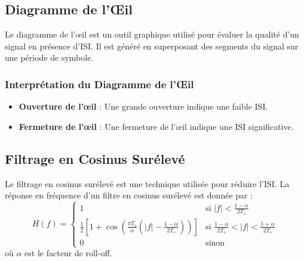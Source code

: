 \documentclass[10pt,a4paper]{article}
\begin{document}
\subsection*{Diagramme de l'Œil}
Le diagramme de l'œil est un outil graphique utilisé pour évaluer la qualité d'un signal en présence d'ISI. Il est généré en superposant des segments du signal sur une période de symbole.

\subsubsection*{Interprétation du Diagramme de l'Œil}
\begin{itemize}
    \item \textbf{Ouverture de l'œil} : Une grande ouverture indique une faible ISI.
    \item \textbf{Fermeture de l'œil} : Une fermeture de l'œil indique une ISI significative.
\end{itemize}


\subsection*{Filtrage en Cosinus Surélevé}
Le filtrage en cosinus surélevé est une technique utilisée pour réduire l'ISI. La réponse en fréquence d'un filtre en cosinus surélevé est donnée par :
\[ H(f) =
  \begin{cases}
   1 & \text{si } |f| < \frac{1 - \alpha}{2T_s} \\
   \frac{1}{2} \left[1 + \cos\left(\frac{\pi T_s}{\alpha} \left(|f| - \frac{1 - \alpha}{2T_s}\right)\right)\right] & \text{si } \frac{1 - \alpha}{2T_s} < |f| < \frac{1 + \alpha}{2T_s} \\
   0 & \text{sinon}
  \end{cases}
\]
où \( \alpha \) est le facteur de roll-off.
\end{document}
